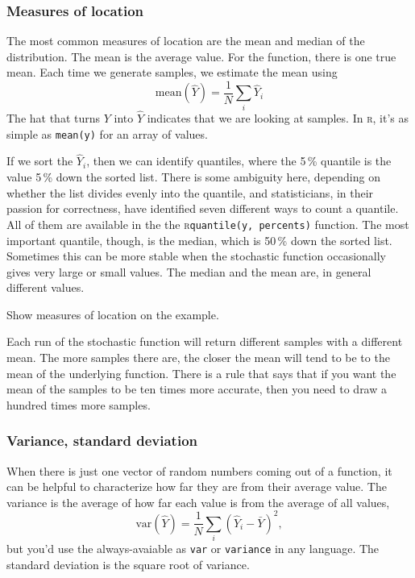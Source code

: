 \documentclass[fleqn,10pt]{olplainarticle}
\newcommand{\rlang}{\textsc{r}\xspace}
\begin{document}
\subsubsection{Measures of location}
The most common measures of location are the mean and median of the distribution.
The mean is the average value. For the function, there is one true
mean. Each time we generate samples, we estimate the mean using
\begin{equation}
  \mbox{mean}(\hat{Y}) = \frac{1}{N}\sum_i{\hat{Y}_i}
\end{equation}
The hat that turns $Y$ into $\hat{Y}$ indicates that we are looking at samples.
In \rlang, it's as simple as \lstinline!mean(y)! for an array of values.

If we sort the $\hat{Y}_i$, then we can identify quantiles, where the
5\,\% quantile is the value 5\,\% down the sorted list. There is some
ambiguity here, depending on whether the list divides evenly into the
quantile, and statisticians, in their passion for correctness, have identified
seven different ways to count a quantile. All of them are available
in the the \rlang \lstinline!quantile(y, percents)! function.
The most important quantile, though, is the median, which is 50\,\%
down the sorted list. Sometimes this can be more stable when the
stochastic function occasionally gives very large or small values.
The median and the mean are, in general different values.

Show measures of location on the example.

Each run of the stochastic function will return different samples
with a different mean. The more samples there are, the closer
the mean will tend to be to the mean of the underlying function.
There is a rule that says that if you want the mean of the samples
to be ten times more accurate, then you need to draw a hundred times
more samples.

\subsubsection{Variance, standard deviation}
When there is just one vector of random numbers coming out
of a function, it can be helpful to characterize how far
they are from their average value. The variance is
the average of how far each value is from the average of all
values,
\begin{equation}
  \mbox{var}(\hat{Y}) = \frac{1}{N}\sum_i (\hat{Y}_i - \bar{Y})^2,
\end{equation}
but you'd use the always-avaiable
as \lstinline!var! or \lstinline!variance! in any language.
The standard deviation is the square root of variance.
\end{document}
